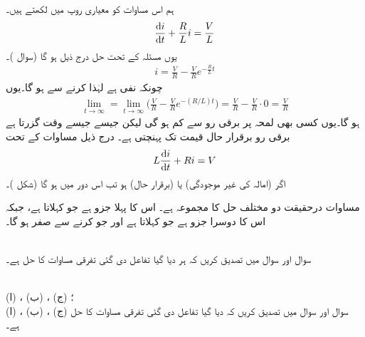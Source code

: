 ہم اس مساوات کو معیاری روپ میں لکھتے ہیں۔
\begin{align}\label{مساوات_ماورائی_سلسلہ_وار_تفرقی}
\frac{\dif i}{\dif t}+\frac{R}{L}i=\frac{V}{L}
\end{align}
یوں مسئلہ  کے تحت حل درج ذیل ہو گا (سوال )۔
\begin{align}\label{مساوات_ماورائی_سلسلہ_وار_دور_حل}
i=\frac{V}{R}-\frac{V}{R}e^{-\tfrac{R}{L}t}
\end{align}
چونکہ  نفی ہے لہٰذا  کرنے سے  ہو گا۔یوں 
\begin{align*}
\lim_{t\to \infty}=\lim_{t\to \infty}\big(\frac{V}{R}-\frac{V}{R}e^{-(R/L)t}\big)=\frac{V}{R}-\frac{V}{R}\cdot 0=\frac{V}{R}
\end{align*}
ہو گا۔یوں کسی بھی لمحہ پر برقی رو  سے کم ہو گی لیکن جیسے جیسے وقت گزرتا ہے برقی رو برقرار حال قیمت  تک پہنچتی ہے۔  درج ذیل مساوات کے تحت
\begin{align*}
L\frac{\dif i}{\dif t}+Ri=V
\end{align*}
اگر  (امالہ کی غیر موجودگی) یا  (برقرار حال) ہو تب اس دور میں  ہو گا (شکل )۔

مساوات  درحقیقت دو مختلف حل کا مجموعہ ہے۔ اس کا پہلا جزو  ہے جو   کہلاتا   ہے،  جبکہ اس کا دوسرا جزو   ہے جو    کہلاتا ہے  اور جو  کرنے سے صفر ہو گا۔


\\
سوال  اور سوال  میں تصدیق کریں کہ ہر  دیا گیا تفاعل  دی گئی تفرقی مساوات کا حل ہے۔

\\
 (ا) ، (ب) ، (ج) 
؛\\
(ا) ، (ب) ، (ج) 
سوال  اور سوال  میں تصدیق کریں کہ  دیا گیا تفاعل  دی گئی  تفرقی مساوات کا حل ہے۔

